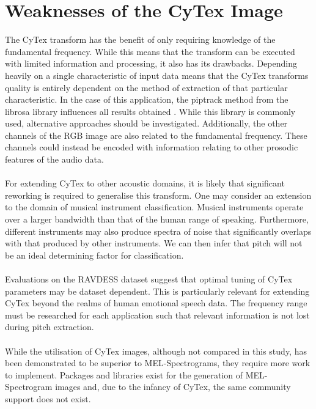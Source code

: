 \section{Weaknesses of the CyTex Image}
The CyTex transform has the benefit of only requiring knowledge of the fundamental frequency. While this means that the transform can be executed with limited information and processing, it also has its drawbacks. Depending heavily on a single characteristic of input data means that the CyTex transforms quality is entirely dependent on the method of extraction of that particular characteristic. In the case of this application, the piptrack method from the librosa library influences all results obtained \cite{mcfee2015librosa}. While this library is commonly used, alternative approaches should be investigated. Additionally, the other channels of the RGB image are also related to the fundamental frequency. These channels could instead be encoded with information relating to other prosodic features of the audio data.\\ \\
For extending CyTex to other acoustic domains, it is likely that significant reworking is required to generalise this transform. One may consider an extension to the domain of musical instrument classification. Musical instruments operate over a larger bandwidth than that of the human range of speaking. Furthermore, different instruments may also produce spectra of noise that significantly overlaps with that produced by other instruments. We can then infer that pitch will not be an ideal determining factor for classification.\\ \\
Evaluations on the RAVDESS dataset suggest that optimal tuning of CyTex parameters may be dataset dependent. This is particularly relevant for extending CyTex beyond the realms of human emotional speech data. The frequency range must be researched for each application such that relevant information is not lost during pitch extraction.\\ \\
While the utilisation of CyTex images, although not compared in this study, has been demonstrated to be superior to MEL-Spectrograms, they require more work to implement. Packages and libraries exist for the generation of MEL-Spectrogram images and, due to the infancy of CyTex, the same community support does not exist.


